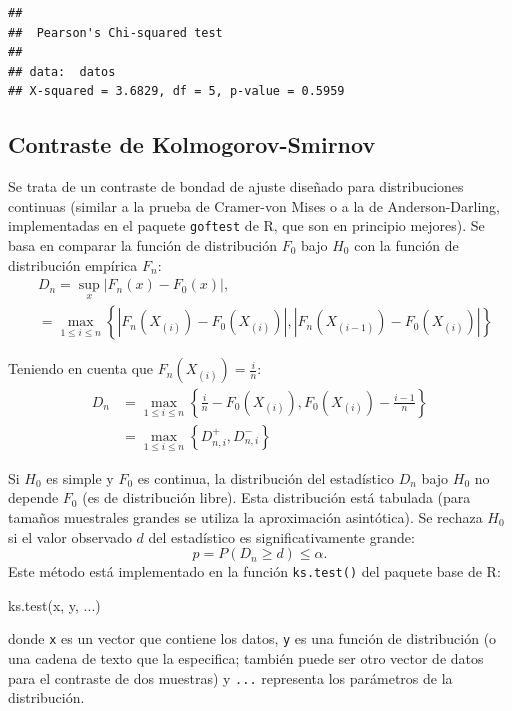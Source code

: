 \documentclass[
]{book}
\newenvironment{Shaded}{\begin{snugshade}}{\end{snugshade}}
\newcommand{\FunctionTok}[1]{\textcolor[rgb]{0.00,0.00,0.00}{#1}}
\newcommand{\NormalTok}[1]{#1}
\theoremstyle{break}
\theoremstyle{definition}
\theoremstyle{definition}
\theoremstyle{definition}
\theoremstyle{definition}
\theoremstyle{remark}
\begin{document}
\begin{verbatim}
## 
##  Pearson's Chi-squared test
## 
## data:  datos
## X-squared = 3.6829, df = 5, p-value = 0.5959
\end{verbatim}

\hypertarget{ks-test}{%
\subsection{Contraste de Kolmogorov-Smirnov}\label{ks-test}}

Se trata de un contraste de bondad de ajuste diseñado para distribuciones continuas
(similar a la prueba de Cramer-von Mises o a la de Anderson-Darling, implementadas en el paquete \texttt{goftest} de R, que son en principio mejores).
Se basa en comparar la función de distribución \(F_0\) bajo \(H_0\) con la función de distribución empírica \(F_n\):
\[\begin{aligned}
& D_n=\sup_{x}|F_n(x)-F_0(x)|,\\
& = \max_{1 \leq i \leq n} \left\{ |F_n(X_{(i)})-F_0(X_{(i)})|,|F_n(X_{(i-1)})-F_0(X_{(i)})| \right\}
\end{aligned}\]

Teniendo en cuenta que \(F_n\left( X_{(i)}\right) = \frac{i}n\):
\[\begin{aligned}
D_n  & =\max_{1\leq i\leq n}\left \{  \frac{i}n-F_0(X_{(i)}),F_0(X_{(i)})-\frac{i-1}n\right \} \\
& =\max_{1\leq i\leq n}\left \{  D_{n,i}^{+},D_{n,i}^{-}\right \}
\end{aligned}\]

Si \(H_0\) es simple y \(F_0\) es continua, la distribución del estadístico \(D_n\) bajo \(H_0\) no depende \(F_0\) (es de distribución libre).
Esta distribución está tabulada (para tamaños muestrales grandes se utiliza la aproximación asintótica).
Se rechaza \(H_0\) si el valor observado \(d\) del estadístico es significativamente grande:
\[p = P \left( D_n \geq d \right) \leq \alpha.\]
Este método está implementado en la función \texttt{ks.test()} del paquete base de R:

\begin{Shaded}
\begin{Highlighting}[]
\FunctionTok{ks.test}\NormalTok{(x, y, ...)}
\end{Highlighting}
\end{Shaded}

donde \texttt{x} es un vector que contiene los datos, \texttt{y} es una función de distribución
(o una cadena de texto que la especifica; también puede ser otro vector de datos
para el contraste de dos muestras) y \texttt{...} representa los parámetros de la distribución.
\end{document}
